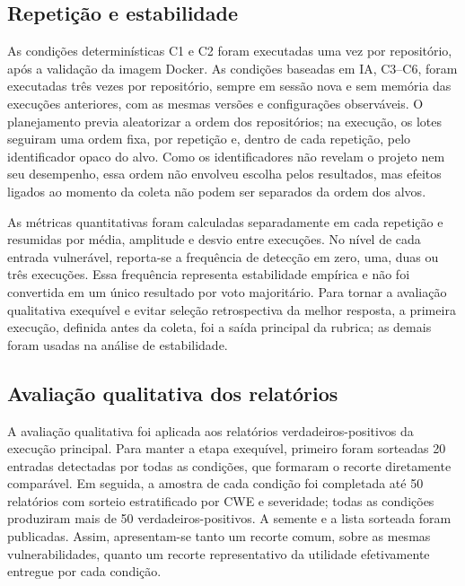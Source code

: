 \subsection{Repetição e estabilidade}\label{subsec:testes-ensaios}

As condições determinísticas C1 e C2 foram executadas uma vez por repositório, após a validação da imagem Docker. As condições baseadas em IA, C3--C6, foram executadas três vezes por repositório, sempre em sessão nova e sem memória das execuções anteriores, com as mesmas versões e configurações observáveis. O planejamento previa aleatorizar a ordem dos repositórios; na execução, os lotes seguiram uma ordem fixa, por repetição e, dentro de cada repetição, pelo identificador opaco do alvo. Como os identificadores não revelam o projeto nem seu desempenho, essa ordem não envolveu escolha pelos resultados, mas efeitos ligados ao momento da coleta não podem ser separados da ordem dos alvos.

As métricas quantitativas foram calculadas separadamente em cada repetição e resumidas por média, amplitude e desvio entre execuções. No nível de cada entrada vulnerável, reporta-se a frequência de detecção em zero, uma, duas ou três execuções. Essa frequência representa estabilidade empírica e não foi convertida em um único resultado por voto majoritário. Para tornar a avaliação qualitativa exequível e evitar seleção retrospectiva da melhor resposta, a primeira execução, definida antes da coleta, foi a saída principal da rubrica; as demais foram usadas na análise de estabilidade.

\subsection{Avaliação qualitativa dos relatórios}\label{subsec:metricas-qualitativas-metodologia}

A avaliação qualitativa foi aplicada aos relatórios verdadeiros-positivos da execução principal. Para manter a etapa exequível, primeiro foram sorteadas 20 entradas detectadas por todas as condições, que formaram o recorte diretamente comparável. Em seguida, a amostra de cada condição foi completada até 50 relatórios com sorteio estratificado por CWE e severidade; todas as condições produziram mais de 50 verdadeiros-positivos. A semente e a lista sorteada foram publicadas. Assim, apresentam-se tanto um recorte comum, sobre as mesmas vulnerabilidades, quanto um recorte representativo da utilidade efetivamente entregue por cada condição.

